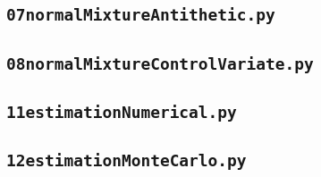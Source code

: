 \documentclass[12pt,a4paper]{article}
\begin{document}
\subsection{\lstinline$07normalMixtureAntithetic.py$}
\label{sec:07normalMixtureAntithetic}


\subsection{\lstinline$08normalMixtureControlVariate.py$}
\label{sec:08normalMixtureControlVariate}



\subsection{\lstinline$11estimationNumerical.py$}
\label{sec:11estimationNumerical}


\subsection{\lstinline$12estimationMonteCarlo.py$}
\label{sec:12estimationMonteCarlo}





\clearpage 



\end{document}
